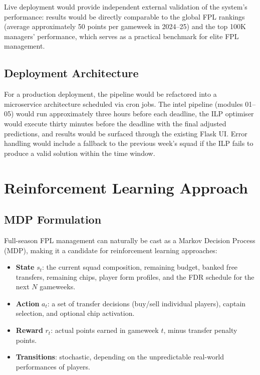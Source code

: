 Live deployment would provide independent external validation of the system's performance: results would be directly comparable to the global FPL rankings (average approximately 50 points per gameweek in 2024--25) and the top 100K managers' performance, which serves as a practical benchmark for elite FPL management.

\subsection{Deployment Architecture}

For a production deployment, the pipeline would be refactored into a microservice architecture scheduled via cron jobs. The intel pipeline (modules 01--05) would run approximately three hours before each deadline, the ILP optimiser would execute thirty minutes before the deadline with the final adjusted predictions, and results would be surfaced through the existing Flask UI. Error handling would include a fallback to the previous week's squad if the ILP fails to produce a valid solution within the time window.

\section{Reinforcement Learning Approach}

\subsection{MDP Formulation}

Full-season FPL management can naturally be cast as a Markov Decision Process (MDP), making it a candidate for reinforcement learning approaches:

\begin{itemize}
  \item \textbf{State} $s_t$: the current squad composition, remaining budget, banked free transfers, remaining chips, player form profiles, and the FDR schedule for the next $N$ gameweeks.
  \item \textbf{Action} $a_t$: a set of transfer decisions (buy/sell individual players), captain selection, and optional chip activation.
  \item \textbf{Reward} $r_t$: actual points earned in gameweek $t$, minus transfer penalty points.
  \item \textbf{Transitions}: stochastic, depending on the unpredictable real-world performances of players.
\end{itemize}

